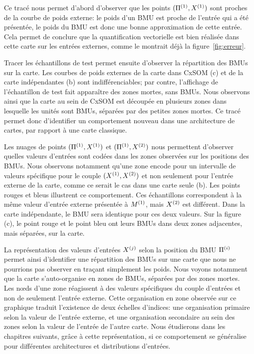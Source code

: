 \documentclass[../main]{subfiles}
\begin{document}
Ce tracé nous permet d'abord d'observer que les points $(\Pi^{({1})},X^{({1})})$ sont proches de la courbe de poids externe: le poids d'un BMU est proche de l'entrée qui a été présentée, le poids du BMU est donc une bonne approximation de cette entrée. Cela permet de conclure que la quantification vectorielle est bien réalisée dans cette carte sur les entrées externes, comme le montrait déjà la figure~\ref{fig:erreur}.

Tracer les échantillons de test permet ensuite d'observer la répartition des BMUs sur la carte. Les courbes de poids externes de la carte dans CxSOM (c) et de la carte indépendantes (b) sont indifférenciables; par contre, l'affichage de l'échantillon de test fait apparaître des zones mortes, sans BMUs. Nous observons ainsi que la carte au sein de CxSOM est découpée en plusieurs zones dans lesquelle les unités sont BMUs, séparées par des petites zones mortes. Ce tracé permet donc d'identifier un comportement nouveau dans une architecture de cartes, par rapport à une carte classique.

Les nuages de points $(\Pi^{({1})},X^{({1})})$ et $(\Pi^{({1})},X^{({2})})$ nous permettent d'observer quelles valeurs d'entrées sont codées dans les zones observées sur les positions des BMUs.
Nous observons notamment qu'une zone encode pour un intervalle de valeurs spécifique pour le couple $(X^{({1})},X^{({2})})$ et non seulement pour l'entrée externe de la carte, comme ce serait le cas dans une carte seule (b). Les points rouges et bleus illustrent ce comportement.
Ces échantillons correspondent à la même valeur d'entrée externe présentée à $M^{({1})}$, mais $X^{({2})}$ est différent.
Dans la carte indépendante, le BMU sera identique pour ces deux valeurs.
Sur la figure (c), le point rouge et le point bleu ont leurs BMUs dans deux zones adjacentes, mais séparées, sur la carte.

La représentation des valeurs d'entrées $X^{({j})}$ selon la position du BMU $\Pi^{({i})}$ permet ainsi d'identifier une répartition des BMUs sur une carte que nous ne pourrions pas observer en traçant simplement les poids.
Nous voyons notamment que la carte s'auto-organise en zones de BMUs, séparées par des zones mortes.
Les n\oe{}ds d'une zone réagissent à des valeurs spécifiques du couple d'entrées et non de seulement l'entrée externe.
Cette organisation en zone observée sur ce graphique traduit l'existence de deux échelles d'indices: une organisation primaire selon la valeur de l'entrée externe, et une organisation secondaire au sein des zones selon la valeur de l'entrée de l'autre carte.
Nous étudierons dans les chapitres suivants, grâce à cette représentation, si ce comportement se généralise pour différentes architectures et distributions d'entrées.
\end{document}

